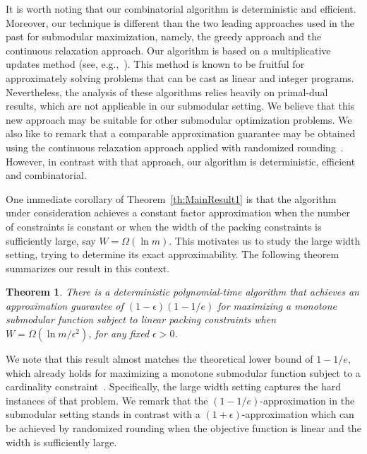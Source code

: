 \documentclass[11pt]{article}
\theoremstyle{plain}
\newtheorem{theorem}{Theorem}[section]
\theoremstyle{definition}
\begin{document}
It is worth noting that our combinatorial algorithm is
deterministic and efficient. Moreover, our technique is different
than the two leading approaches used in the past for submodular
maximization, namely, the greedy approach and the continuous
relaxation approach. Our algorithm is based on a multiplicative
updates method (see,
e.g.,~\cite{PlotkinST95,Young95,GargK07,AzarR06,BriestKV05}). This
method is known to be fruitful for approximately solving problems
that can be cast as linear and integer programs. Nevertheless, the
analysis of these algorithms relies heavily on primal-dual
results, which are not applicable in our submodular setting. We
believe that this new approach may be suitable for other
submodular optimization problems. We also like to remark that a
comparable approximation guarantee may be obtained using the
continuous relaxation approach applied with randomized
rounding~\cite{ChekuriV10}. However, in contrast with that
approach, our algorithm is deterministic, efficient and
combinatorial.

One immediate corollary of Theorem~\ref{th:MainResult1} is that
the algorithm under consideration achieves a constant factor
approximation when the number of constraints is constant or when
the width of the packing constraints is sufficiently large, say $W
= \Omega(\ln m)$. This motivates us to study the large width
setting, trying to determine its exact approximability. The
following theorem summarizes our result in this context.

\begin{theorem} \label{th:MainResult2}
There is a deterministic polynomial-time algorithm that achieves
an approximation guarantee of $(1 - \epsilon)(1 - 1/e)$ for
maximizing a monotone submodular function subject to linear
packing constraints when $W = \Omega(\ln m / \epsilon^2)$, for any
fixed $\epsilon > 0$.
\end{theorem}

We note that this result almost matches the theoretical lower
bound of $1 - 1/e$, which already holds for maximizing a monotone
submodular function subject to a cardinality
constraint~\cite{NemhauserWF78,Feige98}. Specifically, the large
width setting captures the hard instances of that problem. We
remark that the $(1 - 1/e)$-approximation in the submodular
setting stands in contrast with a $(1 + \epsilon)$-approximation
which can be achieved by randomized rounding when the objective
function is linear and the width is sufficiently large.
\end{document}
